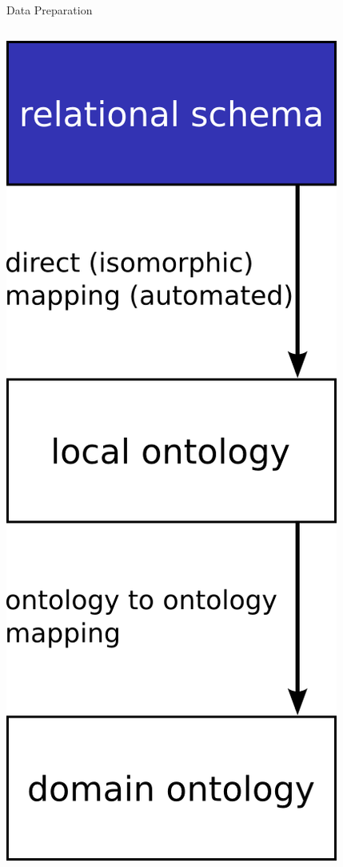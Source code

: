 \message{ !name(presentation.tex)}\documentclass{beamer}
\begin{document}
\begin{frame}{Data Preparation}
\begin{columns}
\begin{column}{.3\textwidth}
\includegraphics[width=\textwidth,height=.88\textheight,keepaspectratio]{g1}


\end{column}
\end{columns}
\end{frame}
\end{document}
